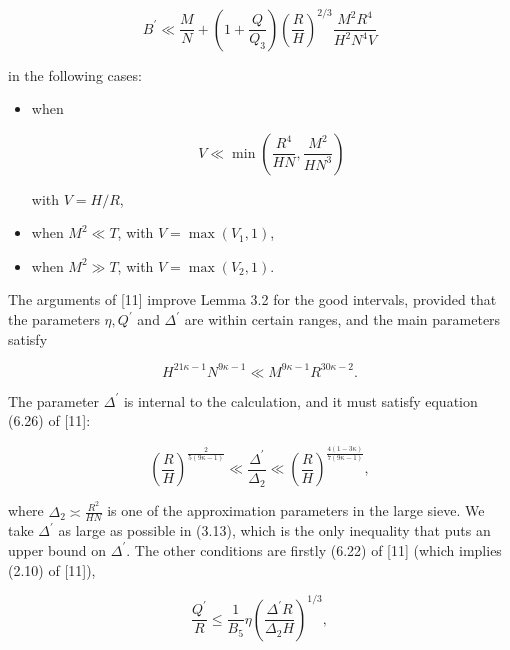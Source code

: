 \documentclass[10pt]{article}
\begin{document}
\begin{equation*}
B^{\prime} \ll \frac{M}{N}+\left(1+\frac{Q}{Q_{3}}\right)\left(\frac{R}{H}\right)^{2 / 3} \frac{M^{2} R^{4}}{H^{2} N^{4} V} \tag{3.10}
\end{equation*}


in the following cases:

\begin{itemize}
  \item[(A)] when

\begin{equation*}
V \ll \min \left(\frac{R^{4}}{H N}, \frac{M^{2}}{H N^{3}}\right) \tag{3.11}
\end{equation*}

with $V=H / R$,
  \item[(B)] when $M^{2} \ll T$, with $V=\max \left(V_{1}, 1\right)$,
  \item[(C)] when $M^{2} \gg T$, with $V=\max \left(V_{2}, 1\right)$.
\end{itemize}

The arguments of [11] improve Lemma 3.2 for the good intervals, provided that the parameters $\eta, Q^{\prime}$ and $\Delta^{\prime}$ are within certain ranges, and the main parameters satisfy


\begin{equation*}
H^{21 \kappa-1} N^{9 \kappa-1} \ll M^{9 \kappa-1} R^{30 \kappa-2}. \tag{3.12}
\end{equation*}


The parameter $\Delta^{\prime}$ is internal to the calculation, and it must satisfy equation (6.26) of [11]:


\begin{equation*}
\left(\frac{R}{H}\right)^{\frac{2}{5(9 \kappa-1)}} \ll \frac{\Delta^{\prime}}{\Delta_{2}} \ll\left(\frac{R}{H}\right)^{\frac{4(1-3 \kappa)}{7(9 \kappa-1)}}, \tag{3.13}
\end{equation*}


where $\Delta_{2} \asymp \frac{R^{2}}{HN}$ is one of the approximation parameters in the large sieve. We take $\Delta^{\prime}$ as large as possible in (3.13), which is the only inequality that puts an upper bound on $\Delta^{\prime}$. The other conditions are firstly (6.22) of [11] (which implies (2.10) of [11]),


\begin{equation*}
\frac{Q^{\prime}}{R} \leqslant \frac{1}{B_{5}} \eta\left(\frac{\Delta^{\prime} R}{\Delta_{2} H}\right)^{1 / 3}, \tag{3.14}
\end{equation*}
\end{document}
